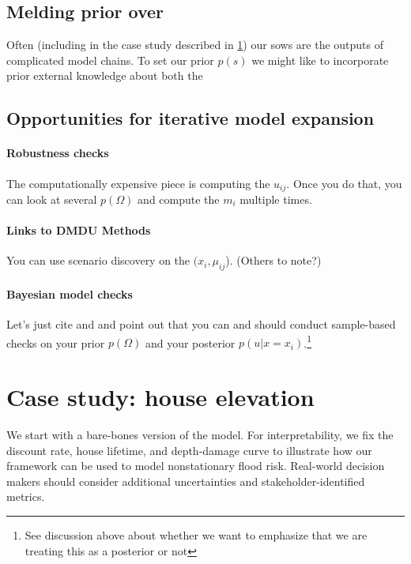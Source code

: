 \documentclass[12pt]{article}
\begin{document}
\subsection{Melding prior over }\label{sec:methods-prior}

Often (including in the case study described in \cref{sec:case}) our \glspl{sow} are the outputs of complicated model chains.
To set our prior $p(s)$ we might like to incorporate prior external knowledge about both the

\subsection{Opportunities for iterative model expansion}\label{sec:methods-iterative}

\paragraph{Robustness checks}
The computationally expensive piece is computing the $u_{ij}$.
Once you do that, you can look at several $p(\Omega)$ and compute the $m_i$ multiple times.

\paragraph{Links to DMDU Methods}
You can use scenario discovery on the $(x_i, \mu_{ij}$).
(Others to note?)

\paragraph{Bayesian model checks}
Let's just cite \citet{gelman_workflow:2020} and \citet{gabry_visualization:2019} and point out that you can and should conduct sample-based checks on your prior $p(\Omega)$ and your posterior $p(u | x=x_i)$.\footnote{See discussion above about whether we want to emphasize that we are treating this as a posterior or not}

\section{Case study: house elevation}\label{sec:case}

We start with a bare-bones version of the \citet{zarekarizi_suboptimal:2020} model.
For interpretability, we fix the discount rate, house lifetime, and depth-damage curve to illustrate how our framework can be used to model nonstationary flood risk.
Real-world decision makers should consider additional uncertainties and stakeholder-identified metrics.
\end{document}
